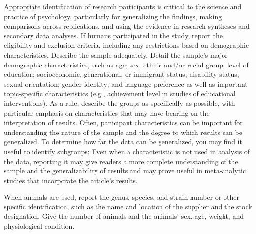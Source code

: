 Appropriate identification of research participants is critical to the science and practice of psychology, particularly for generalizing the findings, making comparisons across replications, and using the evidence in research syntheses and secondary data analyses. If humans participated in the study, report the eligibility and exclusion criteria, including any restrictions based on demographic characteristics.
Describe the sample adequately. Detail the sample's major demographic characteristics, such as age; sex; ethnic and/or racial group; level of education; socioeconomic, generational, or immigrant status; disability status; sexual orientation; gender identity; and language preference as well as important topic-specific characteristics (e.g., achievement level in studies of educational interventions). As a rule, describe the groups as specifically as possible, with particular emphasis on characteristics that may have bearing on the interpretation of results. Often, panicipant characteristics can be important for understanding the nature of the sample and the degree to which results can be generalized. To determine how far the data can be generalized, you may find it useful to identify subgroups: Even when a characteristic is not used in analysis of the data, reporting it may give readers a more complete understanding of the sample and the generalizability of results and may prove useful in meta-analytic studies that incorporate the article's results.

When animals are used, report the genus, species, and strain number or other specific identification, such as the name and location of the supplier and the stock designation. Give the number of animals and the animals' sex, age, weight, and physiological condition.